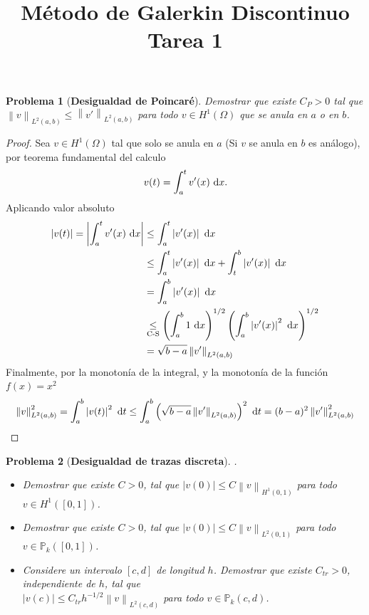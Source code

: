 \documentclass[10pt,a4paper]{report}
\title{\color{azul}\textbf{Método de Galerkin Discontinuo}\\
	\textbf{Tarea 1}}
\author{\color{azul}\autor}
\date{\color{azul}\fecha}
\newtheorem{pro}{Problema}
\newcommand{\dx}{\textup{d}x}
\newcommand{\dt}{\textup{d}t}
\providecommand{\abs}[1]{\left\lvert#1\right\rvert}
\providecommand{\norm}[1]{\left\lVert#1\right\rVert}
\begin{document}
	\begin{pro}[\textbf{Desigualdad de Poincaré}]
		Demostrar que existe $C_{P}>0$ tal que $\norm{v}_{L^{2}(a,b)} \leq \norm{v'}_{L^{2}(a,b)}$ para todo $v\in H^{1}(\Omega)$ que se anula en $a$ o en $b$.
	\end{pro}
	\begin{proof}
		Sea $v\in H^{1}(\Omega)$ tal que solo se anula en $a$ (Si $v$ se anula en $b$ es análogo), por teorema fundamental del calculo
		\begin{align*}
			v(t) = \int_{a}^{t} v'(x)\ \dx.
		\end{align*}
	    Aplicando valor absoluto
	    \begin{align*}
	       \abs{v(t)} = \abs{\int_{a}^{t} v'(x)\ \dx} &\leq \int_{a}^{t} \abs{v'(x)}\ \dx\\ &\leq \int_{a}^{t} \abs{v'(x)}\ \dx + \int_{t}^{b} \abs{v'(x)}\ \dx\\ &= \int_{a}^{b} \abs{v'(x)}\ \dx\\ &\underset{\textup{C-S}}{\leq} \left(\int_{a}^{b} 1\ \dx\right)^{1/2}\left(\int_{a}^{b} \abs{v'(x)}^{2}\ \dx\right)^{1/2}\\
	       &= \sqrt{b-a}\norm{v'}_{L^{2}(a,b)}
	    \end{align*}
        Finalmente, por la monotonía de la integral, y la monotonía de la función $f(x) = x^{2}$
        \begin{align*}
        	\norm{v}_{L^{2}(a,b)}^{2} = \int_{a}^{b} \abs{v(t)}^{2}\ \dt \leq \int_{a}^{b}\left(\sqrt{b-a}\norm{v'}_{L^{2}(a,b)}\right)^{2}\ \dt = (b-a)^{2}\norm{v'}^{2}_{L^{2}(a,b)} 
        \end{align*}
	\end{proof}
    \begin{pro}[\textbf{Desigualdad de trazas discreta}].
    	\begin{itemize}
    		\item[($a$)] Demostrar que existe $C > 0$, tal que $\abs{v(0)} \leq C\norm{v}_{H^{1}(0,1)}$ para todo $v\in H^{1}([0, 1])$.
    		\item[($b$)] Demostrar que existe $C > 0$, tal que $\abs{v(0)} \leq C\norm{v}_{L^{2}(0,1)}$ para todo $v\in \mathbb{P}_{k}([0, 1])$.
    		\item[($c$)] Considere un intervalo $[c,d]$ de longitud $h$. Demostrar que existe $C_{tr}>0$, independiente de $h$, tal que\\ $\abs{v(c)}\leq C_{tr}h^{-1/2}\norm{v}_{L^{2}(c,d)}$ para todo $v\in \mathbb{P}_{k}(c,d)$.
    	\end{itemize}
    \end{pro}
\end{document}
